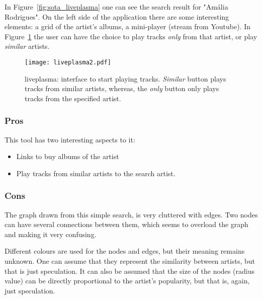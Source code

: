     In Figure~\ref{fig:sota_liveplasma} one can see the search result for "Amália Rodrigues".
    On the left side of the application there are some interesting elements: a grid of the artist's albums, a mini-player (stream from Youtube).
    In Figure~\ref{fig:sota_liveplasma2} the user can have the choice to play tracks \emph{only} from that artist, or play \emph{similar} artists.

    \begin{figure}[b]
      \begin{center}
        \texttt{[image: liveplasma2.pdf]}
      \end{center}
      \caption{liveplasma: interface to start playing tracks. \emph{Similar} button plays tracks from similar artists, whereas, the \emph{only} button only plays tracks from the specified artist.}
      \label{fig:sota_liveplasma2}
    \end{figure}

    \subsubsection{Pros} %
    \label{ssub:liveplasma_pros}

      This tool has two interesting aspects to it:

      \begin{itemize}
        \item Links to buy albums of the artist
        \item Play tracks from similar artists to the search artist.
      \end{itemize}


    \subsubsection{Cons} %
    \label{ssub:liveplasma_cons}

      The graph drawn from this simple search, is very cluttered with edges.
      Two nodes can have several connections between them, which seems to overload the graph and making it very confusing.

      Different colours are used for the nodes and edges, but their meaning remains unknown. One can assume that they represent the similarity between artists, but that is just speculation.
      It can also be assumed that the size of the nodes (radius value) can be directly proportional to the artist's popularity, but that is, again, just speculation.

